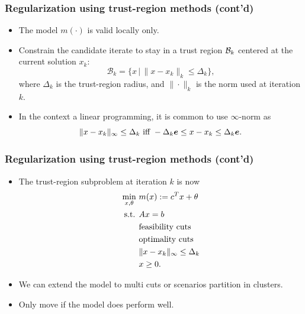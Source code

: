 \documentclass{beamer}
\def\cB{\mathcal{B}}
\begin{document}
\begin{frame}
\frametitle{Regularization using trust-region methods (cont'd)}

\begin{itemize}
	\item The model $m(\cdot)$ is valid locally only.
	\item Constrain the candidate iterate to stay in a trust region ${\mathcal{B}}_k$ centered at the current solution $x_k$:
$$
\cB_k = \{ x \,|\, \| x-x_k \|_k \leq \Delta_k \},
$$
where $\Delta_k$ is the trust-region radius, and $\|\cdot\|_k$ is the norm used at iteration $k$.
\item
In the context a linear programming, it is common to use $\infty$-norm as
$$
\| x-x_k \|_{\infty} \leq \Delta_k \text{ iff } -\Delta_k {\boldsymbol{e}} \leq x-x_k \leq \Delta_k {\boldsymbol{e}}.
$$
\end{itemize}
\end{frame}

\begin{frame}
\frametitle{Regularization using trust-region methods (cont'd)}

\begin{itemize}
	\item 
The trust-region subproblem at iteration $k$ is now
\begin{align*}
	\min_{x,\theta} \ & m(x) := c^T x + \theta \\
	\mbox{s.t. } & Ax = b \\
	& {\rm feasibility\ cuts} \\
	& {\rm optimality\ cuts} \\
	& \|x-x_k\|_{\infty} \leq \Delta_k\\
	& x \geq 0.
\end{align*}
\item
We can extend the model to multi cuts or scenarios partition in clusters.
\item
Only move if the model does perform well.
\end{itemize}

\end{frame}
\end{document}
